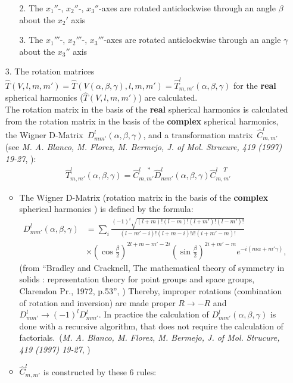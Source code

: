 \begin{enumerate}
\begin{itemize}
    \item[2.]{The $x_1''$-, $x_2''$-, $x_3''$-axes are rotated anticlockwise
     through an angle $\beta$ about the $x_2'$ axis}
    \item[3.]{The $x_1'''$-, $x_2'''$-, $x_3'''$-axes are rotated anticlockwise
     through an angle $\gamma$ about the $x_3''$ axis}
   \end{itemize}
 \item[3.] The rotation matrices~$\hat{T}(V,l,m,m')=\hat{T}(V(\alpha,\beta,\gamma),l,m,m')=\hat{T}^l_{m,m'}(\alpha,\beta,\gamma)$ for the \textbf{real} spherical harmonics ($\hat{T}(V,l,m,m')$)
 are calculated.\\
 The rotation matrix in the basis of the \textbf{real} spherical harmonics is calculated from the rotation matrix in the basis of the \textbf{complex} spherical harmonics, the Wigner D-Matrix~$D^l_{mm'}(\alpha,\beta,\gamma)$, and a transformation matrix~$\hat{C}^l_{m,m'}$ (see \textit{M. A. Blanco, M. Florez, M. Bermejo, J. of Mol. Strucure, 419 (1997) 19-27}, \cite{Blanco1997}):
 \begin{align*}
  \hat{T}^l_{m,m'}(\alpha,\beta,\gamma)=\hat{C}^{l\quad *}_{m,m'}\hat{D}^l_{mm'}(\alpha,\beta,\gamma)\hat{C}^{l\quad T}_{m,m'}
 \end{align*}
 \begin{itemize}
  \item The Wigner D-Matrix (rotation matrix in the basis of the \textbf{complex} spherical harmonics ) is defined by the formula:
    \begin{align*}
    D^l_{mm'}(\alpha,\beta,\gamma)&=\sum_i\frac{(-1)^i\sqrt{(l+m)!(l-m)!(l+m')!
    (l-m')!}}{(l-m'-i)!(l+m-i)!i!(i+m'-m)!}\\
    &\times\left(\cos\frac{\beta}{2}\right)^{2l+m-m'-2i}\left(\sin\frac{\beta}
    {2}\right)^{2i+m'-m}e^{-i(m\alpha+m'\gamma)},
   \end{align*}
   (from ``Bradley and Cracknell, The mathematical theory of symmetry in solids : representation theory for point groups and space groups, Clarendon Pr., 1972, p.53'', \cite{Cracknell1972})
  Thereby, improper rotations (combination of rotation and inversion) are made proper $R\rightarrow-R$ and $D^l_{mm'}\rightarrow(-1)^l D^l_{mm'}$. In practice the calculation of $D^l_{mm'}(\alpha,\beta,\gamma)$ is done with a recursive algorithm, that does not require the calculation of factorials.~(\textit{M. A. Blanco, M. Florez, M. Bermejo, J. of Mol. Strucure, 419 (1997) 19-27}, \cite{Blanco1997})
 \item 
 $\hat{C}^l_{m,m'}$ is constructed by these 6 rules:

\end{itemize}
\end{enumerate}
